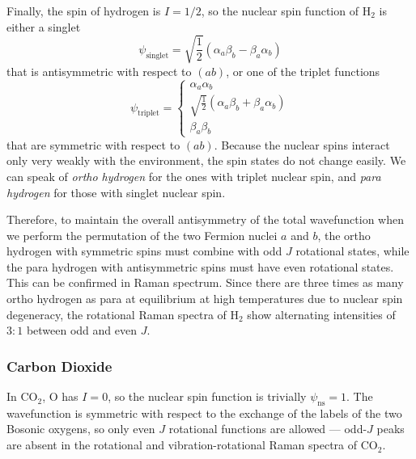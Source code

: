 \documentclass{article}
\theoremstyle{plain}\theoremheaderfont{\normalfont\itshape}\theorembodyfont{\rmfamily}\theoremseparator{.}\newtheorem*{rem}{Remark}\newtheorem*{ex}{Example}\newtheorem*{proof}{Proof}\newtheorem*{altp}{Alternative proof}
\theoremstyle{plain}\theoremheaderfont{\normalfont\bfseries}\theorembodyfont{\rmfamily}\theoremseparator{.}\newtheorem{thm}{Theorem}[section]\newtheorem{lem}[thm]{Lemma}\newtheorem{prop}[thm]{Proposition}\newtheorem*{cor}{Corollary}\newtheorem{defn}[thm]{Definition}\newtheorem{clm}[thm]{Claim}\newtheorem{clminproof}{Claim}\newtheorem*{law}{Law}\newtheorem{pos}[thm]{Postulate}
\theoremstyle{break}\theoremheaderfont{\normalfont\itshape}\theorembodyfont{\rmfamily}\theoremseparator{.\medskip}\newtheorem*{proofskip}{Proof}\newtheorem*{exs}{Examples}\newtheorem*{rems}{Remarks}
\theoremstyle{break}\theoremheaderfont{\normalfont\bfseries}\theorembodyfont{\rmfamily}\theoremseparator{.\medskip}\newtheorem{lemskip}[thm]{Lemma}\newtheorem{defnskip}[thm]{Definition}\newtheorem{propskip}[thm]{Proposition}\newtheorem{thmskip}[thm]{Theorem}
\numberwithin{equation}{section}
\begin{document}
    Finally, the spin of hydrogen is \(I=1/2\), so the nuclear spin function of \(\mathrm{H_2}\) is either a singlet
    \begin{equation}
        \psi_{\text{singlet}}=\sqrt{\frac{1}{2}}(\alpha_a\beta_b-\beta_a\alpha_b)
    \end{equation}
    that is antisymmetric with respect to \((ab)\), or one of the triplet functions
    \begin{equation}
        \psi_{\text{triplet}}=\begin{cases}
            \alpha_a\alpha_b \\
            \sqrt{\frac{1}{2}}(\alpha_a\beta_b+\beta_a\alpha_b) \\
            \beta_a\beta_b
        \end{cases}
    \end{equation}
    that are symmetric with respect to \((ab)\). Because the nuclear spins interact only very weakly with the environment, the spin states do not change easily. We can speak of \textit{ortho hydrogen} for the ones with triplet nuclear spin, and \textit{para hydrogen} for those with singlet nuclear spin.

    Therefore, to maintain the overall antisymmetry of the total wavefunction when we perform the permutation of the two Fermion nuclei \(a\) and \(b\), the ortho hydrogen with symmetric spins must combine with odd \(J\) rotational states, while the para hydrogen with antisymmetric spins must have even rotational states. This can be confirmed in Raman spectrum. Since there are three times as many ortho hydrogen as para at equilibrium at high temperatures due to nuclear spin degeneracy, the rotational Raman spectra of \(\mathrm{H_2}\) show alternating intensities of \(3:1\) between odd and even \(J\).

    \subsubsection*{Carbon Dioxide}
    In \(\mathrm{CO_2}\), \(\mathrm{O}\) has \(I=0\), so the nuclear spin function is trivially \(\psi_{\text{ns}}=1\). The wavefunction is symmetric with respect to the exchange of the labels of the two Bosonic oxygens, so only even \(J\) rotational functions are allowed --- odd-\(J\) peaks are absent in the rotational and vibration-rotational Raman spectra of \(\mathrm{CO_2}\).
\end{document}
